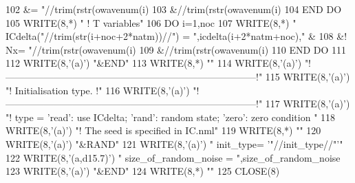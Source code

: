 \begin{DoxyCode}
102 \textcolor{stringliteral}{}\textcolor{stringliteral}{            &= "}//trim(rstr(owavenum(i)%
103             &//trim(rstr(owavenum(i)%
104 \textcolor{keywordflow}{    END DO}
105     \textcolor{keyword}{WRITE}(8,*) \textcolor{stringliteral}{" ! T variables"}
106     \textcolor{keywordflow}{DO} i=1,noc
107        \textcolor{keyword}{WRITE}(8,*) \textcolor{stringliteral}{" ICdelta("}//trim(str(i+noc+2*natm))//\textcolor{stringliteral}{") = "},icdelta(i+2*natm+noc),\textcolor{stringliteral}{"   &}
108 \textcolor{stringliteral}{}\textcolor{stringliteral}{            &! Nx= "}//trim(rstr(owavenum(i)%
109             &//trim(rstr(owavenum(i)%
110 \textcolor{keywordflow}{    END DO}
111 
112     \textcolor{keyword}{WRITE}(8,\textcolor{stringliteral}{'(a)'}) \textcolor{stringliteral}{"&END"}
113     \textcolor{keyword}{WRITE}(8,*) \textcolor{stringliteral}{""}
114     \textcolor{keyword}{WRITE}(8,\textcolor{stringliteral}{'(a)'}) \textcolor{stringliteral}{"!------------------------------------------------------------------------------!"}
115     \textcolor{keyword}{WRITE}(8,\textcolor{stringliteral}{'(a)'}) \textcolor{stringliteral}{"! Initialisation type.                                                         !"}
116     \textcolor{keyword}{WRITE}(8,\textcolor{stringliteral}{'(a)'}) \textcolor{stringliteral}{"!------------------------------------------------------------------------------!"}
117     \textcolor{keyword}{WRITE}(8,\textcolor{stringliteral}{'(a)'}) \textcolor{stringliteral}{"! type = 'read': use ICdelta; 'rand': random state; 'zero': zero condition "}
118     \textcolor{keyword}{WRITE}(8,\textcolor{stringliteral}{'(a)'}) \textcolor{stringliteral}{"! The seed is specified in IC.nml"}
119     \textcolor{keyword}{WRITE}(8,*) \textcolor{stringliteral}{""}
120     \textcolor{keyword}{WRITE}(8,\textcolor{stringliteral}{'(a)'}) \textcolor{stringliteral}{"&RAND"}
121     \textcolor{keyword}{WRITE}(8,\textcolor{stringliteral}{'(a)'}) \textcolor{stringliteral}{"  init\_type= '"}//init\_type//\textcolor{stringliteral}{"'"} 
122     \textcolor{keyword}{WRITE}(8,\textcolor{stringliteral}{'(a,d15.7)'}) \textcolor{stringliteral}{"  size\_of\_random\_noise = "},size\_of\_random\_noise
123     \textcolor{keyword}{WRITE}(8,\textcolor{stringliteral}{'(a)'}) \textcolor{stringliteral}{"&END"}
124     \textcolor{keyword}{WRITE}(8,*) \textcolor{stringliteral}{""}
125     \textcolor{keyword}{CLOSE}(8)
\end{DoxyCode}


